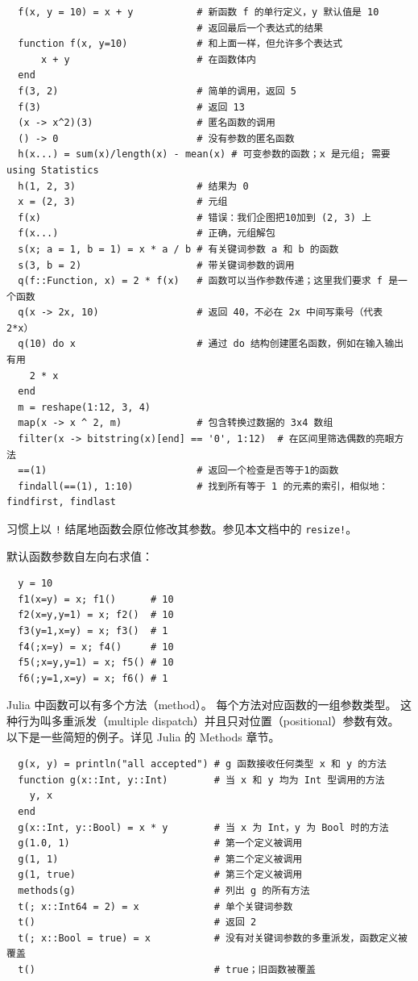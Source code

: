\documentclass[10pt,a4paper]{article}
\begin{document}
\begin{lstlisting}
  f(x, y = 10) = x + y           # 新函数 f 的单行定义，y 默认值是 10
                                 # 返回最后一个表达式的结果
  function f(x, y=10)            # 和上面一样，但允许多个表达式
      x + y                      # 在函数体内
  end
  f(3, 2)                        # 简单的调用，返回 5
  f(3)                           # 返回 13
  (x -> x^2)(3)                  # 匿名函数的调用
  () -> 0                        # 没有参数的匿名函数
  h(x...) = sum(x)/length(x) - mean(x) # 可变参数的函数；x 是元组; 需要 using Statistics
  h(1, 2, 3)                     # 结果为 0
  x = (2, 3)                     # 元组
  f(x)                           # 错误：我们企图把10加到 (2, 3) 上
  f(x...)                        # 正确，元组解包
  s(x; a = 1, b = 1) = x * a / b # 有关键词参数 a 和 b 的函数
  s(3, b = 2)                    # 带关键词参数的调用
  q(f::Function, x) = 2 * f(x)   # 函数可以当作参数传递；这里我们要求 f 是一个函数
  q(x -> 2x, 10)                 # 返回 40，不必在 2x 中间写乘号（代表 2*x）
  q(10) do x                     # 通过 do 结构创建匿名函数，例如在输入输出有用
    2 * x
  end
  m = reshape(1:12, 3, 4)
  map(x -> x ^ 2, m)             # 包含转换过数据的 3x4 数组
  filter(x -> bitstring(x)[end] == '0', 1:12)  # 在区间里筛选偶数的亮眼方法
  ==(1)                          # 返回一个检查是否等于1的函数
  findall(==(1), 1:10)           # 找到所有等于 1 的元素的索引，相似地：findfirst, findlast
\end{lstlisting}

习惯上以 \lstinline|!| 结尾地函数会原位修改其参数。参见本文档中的 \lstinline|resize!|。

默认函数参数自左向右求值：
\begin{lstlisting}
  y = 10
  f1(x=y) = x; f1()      # 10
  f2(x=y,y=1) = x; f2()  # 10
  f3(y=1,x=y) = x; f3()  # 1
  f4(;x=y) = x; f4()     # 10
  f5(;x=y,y=1) = x; f5() # 10
  f6(;y=1,x=y) = x; f6() # 1
\end{lstlisting}

Julia 中\textsf{函数}可以有多个\textsf{方法}（method）。
每个方法对应函数的一组参数类型。
这种行为叫多重派发（multiple dispatch）并且只对位置（positional）参数有效。
以下是一些简短的例子。详见 Julia 的 Methods 章节。
\begin{lstlisting}
  g(x, y) = println("all accepted") # g 函数接收任何类型 x 和 y 的方法
  function g(x::Int, y::Int)        # 当 x 和 y 均为 Int 型调用的方法
    y, x
  end
  g(x::Int, y::Bool) = x * y        # 当 x 为 Int，y 为 Bool 时的方法
  g(1.0, 1)                         # 第一个定义被调用
  g(1, 1)                           # 第二个定义被调用
  g(1, true)                        # 第三个定义被调用
  methods(g)                        # 列出 g 的所有方法
  t(; x::Int64 = 2) = x             # 单个关键词参数
  t()                               # 返回 2
  t(; x::Bool = true) = x           # 没有对关键词参数的多重派发，函数定义被覆盖
  t()                               # true；旧函数被覆盖
\end{lstlisting}
\end{document}
